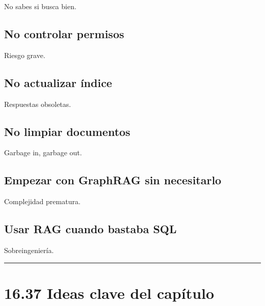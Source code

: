 No sabes si busca bien.

\subsection{No controlar permisos}\label{no-controlar-permisos}

Riesgo grave.

\subsection{No actualizar índice}\label{no-actualizar-uxedndice}

Respuestas obsoletas.

\subsection{No limpiar documentos}\label{no-limpiar-documentos}

Garbage in, garbage out.

\subsection{Empezar con GraphRAG sin
necesitarlo}\label{empezar-con-graphrag-sin-necesitarlo}

Complejidad prematura.

\subsection{Usar RAG cuando bastaba
SQL}\label{usar-rag-cuando-bastaba-sql}

Sobreingeniería.

\begin{center}\rule{0.5\linewidth}{0.5pt}\end{center}

\section{16.37 Ideas clave del
capítulo}\label{ideas-clave-del-capuxedtulo-15}

